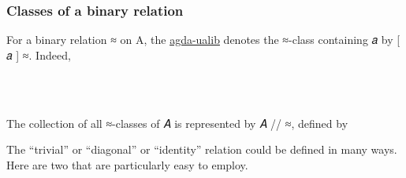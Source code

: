 \documentclass[sigplan,screen]{acmart}
\newcommand{\agdaualib}{\href{https://ualib.org}{agda-ualib}\xspace}
\newcommand{\agdaualib}{\href{anonymizedLink/agda-ualib.html}{agda-ualib}\xspace}
\begin{document}
\subsubsection{Classes of a binary relation}
For a binary relation ≈ on A, the \agdaualib denotes the ≈-class containing 𝑎 by {[} 𝑎 {]} ≈. Indeed,
\begin{code}
\\[\AgdaEmptyExtraSkip]%
\>[0]\AgdaOperator{\AgdaFunction{[\AgdaUnderscore{}]\AgdaUnderscore{}}}\AgdaSpace{}%
\AgdaSymbol{:}%
\>[8]\AgdaSymbol{\{}\AgdaSpace{}%
\AgdaSymbol{:}\AgdaSpace{}%
\AgdaSpace{}%
\AgdaSpace{}%
\AgdaSymbol{\}}\AgdaSpace{}%
%
\>[22]\AgdaSymbol{(}\AgdaSpace{}%
\AgdaSymbol{:}\AgdaSpace{}%
\AgdaSymbol{)}\AgdaSpace{}%
\AgdaSpace{}%
\AgdaSpace{}%
\AgdaSpace{}%
\AgdaSpace{}%
\AgdaSpace{}%
\AgdaSpace{}%
\AgdaSpace{}%
\AgdaSpace{}%
\<%
\\
\>[0]\AgdaOperator{\AgdaFunction{[}}\AgdaSpace{}%
\AgdaSpace{}%
\AgdaOperator{\AgdaFunction{]}}\AgdaSpace{}%
\AgdaSpace{}%
\AgdaSymbol{=}\AgdaSpace{}%
\AgdaSpace{}%
\AgdaSpace{}%
\AgdaSpace{}%
\AgdaSymbol{\AgdaUnderscore{}}\AgdaSpace{}%
\AgdaFunction{,}%
\>[21]\AgdaSpace{}%
\AgdaSpace{}%
\<%
\end{code}
The collection of all ≈-classes of 𝐴 is represented by 𝐴 // ≈, defined by
\begin{code}\end{code}
The ``trivial'' or ``diagonal'' or ``identity'' relation could be defined in many ways.  Here are two that are particularly easy to employ.
\end{document}
